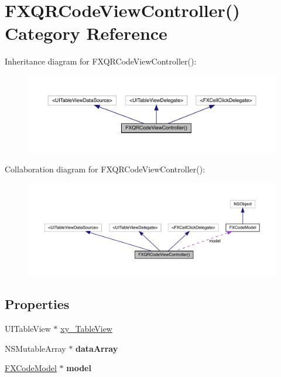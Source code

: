 \hypertarget{category_f_x_q_r_code_view_controller_07_08}{}\section{F\+X\+Q\+R\+Code\+View\+Controller() Category Reference}
\label{category_f_x_q_r_code_view_controller_07_08}


Inheritance diagram for F\+X\+Q\+R\+Code\+View\+Controller()\+:\nopagebreak
\begin{figure}[H]
\begin{center}
\leavevmode
\includegraphics[width=350pt]{category_f_x_q_r_code_view_controller_07_08__inherit__graph}
\end{center}
\end{figure}


Collaboration diagram for F\+X\+Q\+R\+Code\+View\+Controller()\+:\nopagebreak
\begin{figure}[H]
\begin{center}
\leavevmode
\includegraphics[width=350pt]{category_f_x_q_r_code_view_controller_07_08__coll__graph}
\end{center}
\end{figure}
\subsection*{Properties}
\begin{DoxyCompactItemize}
\item 
U\+I\+Table\+View $\ast$ \mbox{\hyperlink{category_f_x_q_r_code_view_controller_07_08_a26cb02f1d514074637d34dad480b2c27}{xy\+\_\+\+Table\+View}}
\item 
\mbox{\label{category_f_x_q_r_code_view_controller_07_08_a1f45bda877c5c05d0e36a5e55716f8e1}} 
N\+S\+Mutable\+Array $\ast$ {\bfseries data\+Array}
\item 
\mbox{\label{category_f_x_q_r_code_view_controller_07_08_a6786fe6915a741b98f2fa8a66ff2c862}} 
\mbox{\hyperlink{interface_f_x_code_model}{F\+X\+Code\+Model}} $\ast$ {\bfseries model}
\end{DoxyCompactItemize}



